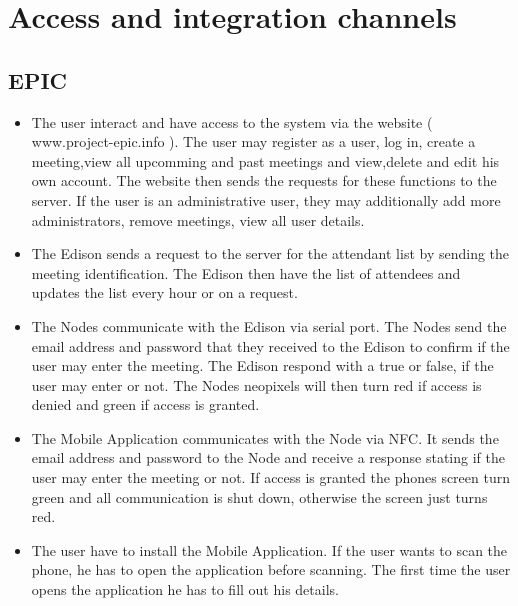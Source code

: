 \documentclass[a4paper,12pt,titlepage]{article}
\begin{document}
\newpage	\section{Access and integration channels}
\subsection{EPIC}
	\begin{itemize}
		\item The user interact and have access to the system via the website ( www.project-epic.info ). The user may register as a user, log in, create a meeting,view all upcomming and past meetings and view,delete and edit his own account. The website then sends the requests for these functions to the server. If the user is an administrative user, they may additionally add more administrators, remove meetings, view all user details.
\item The Edison sends a request to the server for the attendant list by sending the meeting identification. The Edison then have the list of attendees and updates the list every hour or on a request.
\item The Nodes communicate with the Edison via serial port. The Nodes send the email address and password that they received to the Edison to confirm if the user may enter the meeting. The Edison respond with a true or false, if the user may enter or not. The Nodes neopixels will then turn red if access is denied and green if access is granted.
\item The Mobile Application communicates with the Node via NFC. It sends the email address and password to the Node and receive a response stating if the user may enter the meeting or not. If access is granted the phones screen turn green and all communication is shut down, otherwise the screen just turns red.
\item The  user have to install the Mobile Application. If the user wants to scan the phone, he has to open the application before scanning. The first time the user opens the application he has to fill out his details. 

	\end{itemize}
\end{document}
